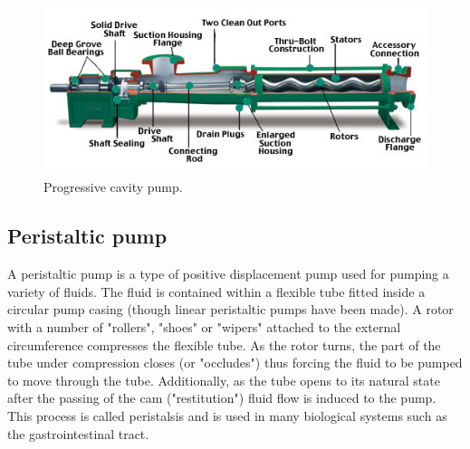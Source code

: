 \begin{figure}[h!]
\begin{center}
\includegraphics[width=0.7 \textwidth]{figs/cutawaylabel.jpg}
\caption{\label{fig:prog_cav_pumps} Progressive cavity pump.}
\end{center}
\end{figure}





\subsection{Peristaltic pump}

A peristaltic pump is a type of positive displacement pump used for pumping a variety of fluids. The fluid is contained within a flexible tube fitted inside a circular pump casing (though linear peristaltic pumps have been made). A rotor with a number of "rollers", "shoes" or "wipers" attached to the external circumference compresses the flexible tube. As the rotor turns, the part of the tube under compression closes (or "occludes") thus forcing the fluid to be pumped to move through the tube. Additionally, as the tube opens to its natural state after the passing of the cam ("restitution") fluid flow is induced to the pump. This process is called peristalsis and is used in many biological systems such as the gastrointestinal tract.

